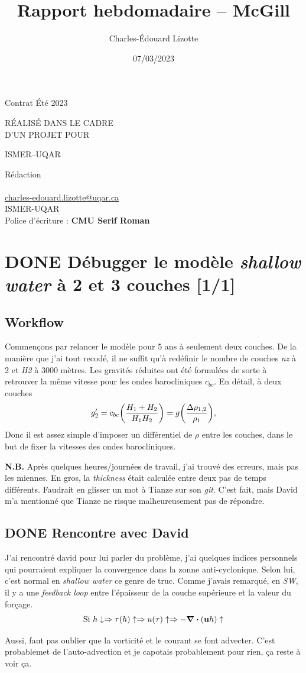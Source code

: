 \documentclass[10pt]{article}
\author{Charles-Édouard Lizotte}
\date{07/03/2023}
\title{Rapport hebdomadaire -- McGill}
\makeatletter
\numberwithin{equation}{section}
\newcommand{\mytitlepage}{
\begin{titlepage}
\begin{center}
{\Huge \thesubtitle \par}
\vspace{2cm}
{\Huge \MakeUppercase{\thetitle} \par}
\vspace{2cm}
RÉALISÉ DANS LE CADRE\\ D'UN PROJET POUR \par
\vspace{2cm}
{\Huge ISMER--UQAR \par}
\vspace{2cm}
{\thedate}
\end{center}
\vfill
Rédaction \\
{\theauthor}\\
\url{charles-edouard.lizotte@uqar.ca}\\
ISMER-UQAR\\
Police d'écriture : \textbf{CMU Serif Roman}
\end{titlepage}
}
\newcommand{\thesubtitle}{Contrat Été 2023}
\makeatother
\begin{document}
\mytitlepage
\tableofcontents\newpage


\section{{\bfseries\sffamily DONE} Débugger le modèle \emph{shallow water} à 2 et 3 couches [1/1]}
\label{sec:org4a876ea}
\subsection{Workflow}
\label{sec:orgdfe19e8}
Commençons par relancer le modèle pour 5 ans à seulement deux couches.
De la manière que j'ai tout recodé, il ne suffit qu'à redéfinir le nombre de couches \emph{nz} à 2 et \emph{H2} à 3000 mètres.
Les gravités réduites ont été formulées de sorte à retrouver la même vitesse pour les ondes barocliniques \(c_{bc}\).
En détail, à deux couches
\begin{equation}
g_2' = c_{bc} \qty(\frac{H_1+H_2}{H_1H_2}) = g \qty(\frac{\Delta \rho_{1,2}}{\rho_1}),
\end{equation}
Donc il est assez simple d'imposer un différentiel de \(\rho\) entre les couches, dans le but de fixer la vitesses des ondes barocliniques.

\textbf{N.B.} Après quelques heures/journées de travail, j'ai trouvé des erreurs, mais pas les miennes.
En gros, la \emph{thickness} était calculée entre deux pas de temps différents.
Faudrait en glisser un mot à Tianze sur son \emph{git}.
C'est fait, mais David m'a mentionné que Tianze ne risque malheureusement pas de répondre.

\subsection{{\bfseries\sffamily DONE} Rencontre avec David}
\label{sec:orgccdb9bb}
J'ai rencontré david pour lui parler du problème, j'ai quelques indices personnels qui pourraient expliquer la convergence dans la zonne anti-cyclonique. 
Selon lui, c'est normal en \emph{shallow water} ce genre de truc.
Comme j'avais remarqué, en \emph{SW}, il y a une \emph{feedback loop} entre l'épaisseur de la couche supérieure et la valeur du forçage.
\begin{equation}
\text{Si } h \downarrow
\Rightarrow \tau (h) \uparrow
\Rightarrow u(\tau) \uparrow
\Rightarrow -\divergence(\vb{u}h) \uparrow
\end{equation}

Aussi, faut pas oublier que la vorticité et le courant se font advecter.
C'est probablemet de l'auto-advection et je capotais probablement pour rien, ça reste à voir ça.\\[0pt]
\end{document}
